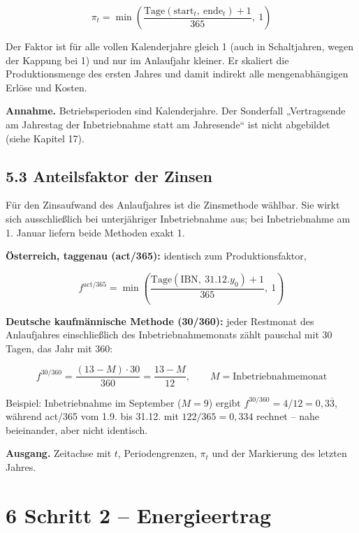 \documentclass[
  a4paper,
  10pt]{article}
\renewenvironment{quote}
  {\begin{tcolorbox}[
      enhanced,
      breakable,
      colback=Wash,
      colframe=Brand,
      boxrule=0pt,
      leftrule=2.2pt,
      arc=0pt,
      left=8pt,right=8pt,top=6pt,bottom=6pt,
      before skip=8pt,after skip=9pt
    ]\small\color{InkSoft}}
  {\end{tcolorbox}}
\begin{document}
\[ \pi_t = \min\left(\frac{\mathrm{Tage}(\mathrm{start}_t,\ \mathrm{ende}_t) + 1}{365},\ 1\right) \]

Der Faktor ist für alle vollen Kalenderjahre gleich 1 (auch in
Schaltjahren, wegen der Kappung bei 1) und nur im Anlaufjahr kleiner. Er
skaliert die Produktionsmenge des ersten Jahres und damit indirekt alle
mengenabhängigen Erlöse und Kosten.

\begin{quote}
\textbf{Annahme.} Betriebsperioden sind Kalenderjahre. Der Sonderfall
„Vertragsende am Jahrestag der Inbetriebnahme statt am Jahresende`` ist
nicht abgebildet (siehe Kapitel 17).
\end{quote}

\hypertarget{anteilsfaktor-der-zinsen}{%
\subsection{5.3 Anteilsfaktor der
Zinsen}\label{anteilsfaktor-der-zinsen}}

Für den Zinsaufwand des Anlaufjahres ist die Zinsmethode wählbar. Sie
wirkt sich ausschließlich bei unterjähriger Inbetriebnahme aus; bei
Inbetriebnahme am 1. Januar liefern beide Methoden exakt 1.

\textbf{Österreich, taggenau (act/365):} identisch zum
Produktionsfaktor,

\[ f^{\mathrm{act/365}} = \min\left(\frac{\mathrm{Tage}(\text{IBN},\ 31.12.y_0) + 1}{365},\ 1\right) \]

\textbf{Deutsche kaufmännische Methode (30/360):} jeder Restmonat des
Anlaufjahres einschließlich des Inbetriebnahmemonats zählt pauschal mit
30 Tagen, das Jahr mit 360:

\[ f^{30/360} = \frac{(13 - M) \cdot 30}{360} = \frac{13 - M}{12}, \qquad M = \text{Inbetriebnahmemonat} \]

Beispiel: Inbetriebnahme im September (\(M = 9\)) ergibt
\(f^{30/360} = 4/12 = 0{,}3\overline{3}\), während act/365 vom 1.9. bis
31.12. mit \(122/365 = 0{,}334\) rechnet -- nahe beieinander, aber nicht
identisch.

\textbf{Ausgang.} Zeitachse mit \(t\), Periodengrenzen, \(\pi_t\) und
der Markierung des letzten Jahres.

\hypertarget{schritt-2-energieertrag}{%
\section{6 Schritt 2 -- Energieertrag}\label{schritt-2-energieertrag}}
\end{document}
